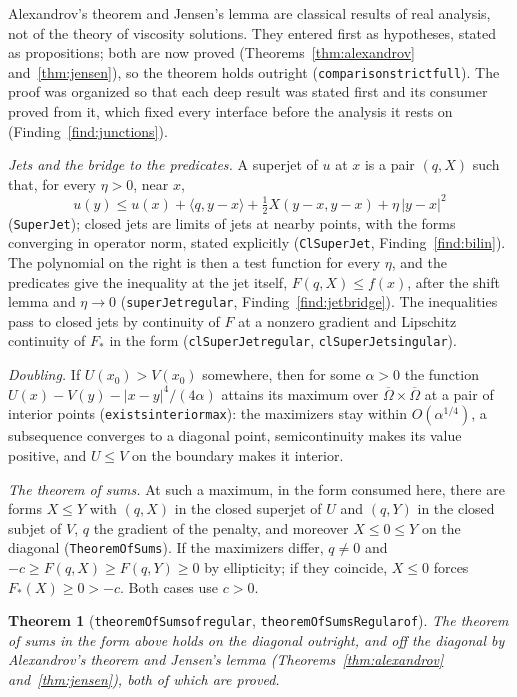 \documentclass[11pt,reqno]{amsart}
\newcommand{\LEANREF}[1]{\texttt{\small\def\_{\textunderscore\allowbreak}#1}}
\theoremstyle{plain}
\newtheorem{theorem}{Theorem}[section]
\theoremstyle{definition}
\begin{document}
Alexandrov's theorem and Jensen's lemma are classical results of real analysis,
not of the theory of viscosity solutions. They entered first as hypotheses,
stated as propositions; both are now proved
(Theorems~\ref{thm:alexandrov} and~\ref{thm:jensen}), so the theorem holds
outright (\LEANREF{comparison\_strict\_full}). The proof was organized
so that each deep result was stated first and its consumer proved from it,
which fixed every interface before the analysis it rests on
(Finding~\ref{find:junctions}).

\emph{Jets and the bridge to the predicates.} A superjet of $u$ at $x$ is a pair
$(q, X)$ such that, for every $\eta > 0$, near $x$,
\[
  u(y) \le u(x) + \langle q, y - x\rangle + \tfrac12 X(y - x, y - x)
    + \eta\,|y - x|^2
\]
(\LEANREF{SuperJet}); closed jets are limits of jets at nearby points, with the
forms converging in operator norm, stated explicitly
(\LEANREF{ClSuperJet}, Finding~\ref{find:bilin}). The polynomial on the right is
then a test function for every $\eta$, and the predicates give the inequality
at the jet itself, $F(q, X) \le f(x)$, after the shift lemma and $\eta \to 0$
(\LEANREF{superJet\_regular}, Finding~\ref{find:jetbridge}). The inequalities
pass to closed jets by continuity of $F$ at a nonzero gradient and Lipschitz
continuity of $F_*$ in the form (\LEANREF{clSuperJet\_regular},
\LEANREF{clSuperJet\_singular}).

\emph{Doubling.} If $U(x_0) > V(x_0)$ somewhere, then for some $\alpha > 0$ the
function $U(x) - V(y) - |x - y|^4/(4\alpha)$ attains its maximum over
$\overline\Omega \times \overline\Omega$ at a pair of interior points
(\LEANREF{exists\_interior\_max}): the maximizers stay within
$O(\alpha^{1/4})$, a subsequence converges to a diagonal point, semicontinuity
makes its value positive, and $U \le V$ on the boundary makes it interior.

\emph{The theorem of sums.} At such a maximum, in the form consumed here, there
are forms $X \le Y$ with $(q, X)$ in the closed superjet of $U$ and $(q, Y)$ in
the closed subjet of $V$, $q$ the gradient of the penalty, and moreover
$X \le 0 \le Y$ on the diagonal (\LEANREF{TheoremOfSums}). If the maximizers
differ, $q \ne 0$ and $-c \ge F(q, X) \ge F(q, Y) \ge 0$ by ellipticity; if they
coincide, $X \le 0$ forces $F_*(X) \ge 0 > -c$. Both cases use $c > 0$.

\begin{theorem}[\LEANREF{theoremOfSums\_of\_regular},
\LEANREF{theoremOfSumsRegular\_of}]\label{thm:sums}
The theorem of sums in the form above holds on the diagonal outright, and off
the diagonal by Alexandrov's theorem and Jensen's lemma
(Theorems~\ref{thm:alexandrov} and~\ref{thm:jensen}), both of which are proved.
\end{theorem}
\end{document}
